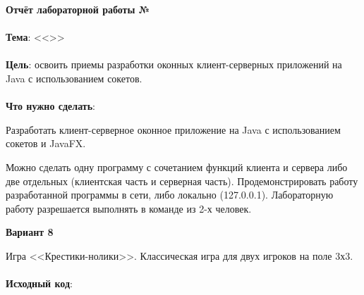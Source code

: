 \documentclass[12pt, a4paper, simple]{eskdtext}
\def \gpiDocTopic {Отчёт лабораторной работы №\gpiDocNum}
\begin{document}
    
    \begin{center}
        \textbf{\gpiDocTopic}
    \end{center}

    \paragraph{} \textbf{Тема}: <<\gpiTopicRep>>

    \paragraph{} \textbf{Цель}: освоить приемы разработки оконных клиент-серверных приложений на Java с использованием сокетов.

    \paragraph{} \textbf{Что нужно сделать}:

    Разработать клиент-серверное оконное приложение на Java с использованием сокетов и JavaFX.

    Можно сделать одну программу с сочетанием функций клиента и сервера либо две отдельных
    (клиентская часть и серверная часть).
    Продемонстрировать работу разработанной программы в сети, либо локально (127.0.0.1).
    Лабораторную работу разрешается выполнять в команде из 2-х человек.

    \begin{center}
        \textbf{Вариант 8}
    \end{center}

    Игра <<Крестики-нолики>>. Классическая игра для двух игроков на поле 3х3.



    \paragraph{} \textbf{Исходный код}: 
\end{document}
